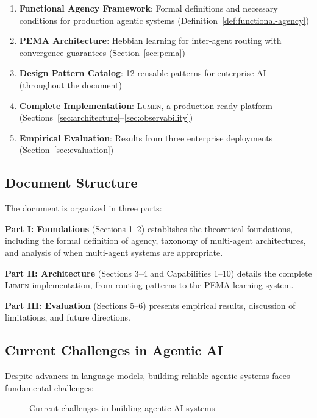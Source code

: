 \documentclass[11pt,a4paper]{article}
\theoremstyle{definition}
\theoremstyle{remark}
\newcommand{\lumen}{\textsc{Lumen}\xspace}
\newcommand{\pema}{\textsc{PEMA}\xspace}
\begin{document}
\begin{enumerate}
    \item \textbf{Functional Agency Framework}: Formal definitions and necessary conditions for production agentic systems (Definition~\ref{def:functional-agency})

    \item \textbf{\pema Architecture}: Hebbian learning for inter-agent routing with convergence guarantees (Section~\ref{sec:pema})

    \item \textbf{Design Pattern Catalog}: 12 reusable patterns for enterprise AI (throughout the document)

    \item \textbf{Complete Implementation}: \lumen, a production-ready platform (Sections~\ref{sec:architecture}--\ref{sec:observability})

    \item \textbf{Empirical Evaluation}: Results from three enterprise deployments (Section~\ref{sec:evaluation})
\end{enumerate}

\subsection{Document Structure}

The document is organized in three parts:

\textbf{Part I: Foundations} (Sections 1--2) establishes the theoretical foundations, including the formal definition of agency, taxonomy of multi-agent architectures, and analysis of when multi-agent systems are appropriate.

\textbf{Part II: Architecture} (Sections 3--4 and Capabilities 1--10) details the complete \lumen implementation, from routing patterns to the \pema learning system.

\textbf{Part III: Evaluation} (Sections 5--6) presents empirical results, discussion of limitations, and future directions.

\subsection{Current Challenges in Agentic AI}

Despite advances in language models, building reliable agentic systems faces fundamental challenges:

\begin{figure}[H]
    \centering
    \vspace{0.5em}
    
    \vspace{0.5em}
    \caption{Current challenges in building agentic AI systems}
    \label{fig:current-challenges}
\end{figure}
\end{document}
